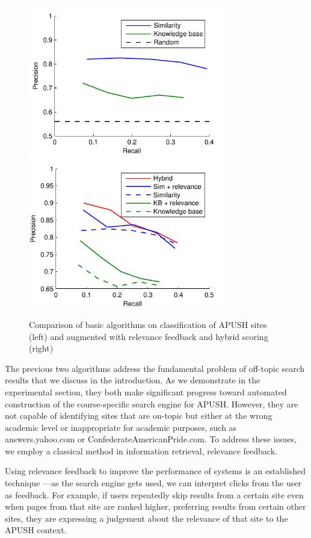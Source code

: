 \documentclass[pdfpagelabels=false,plainpages=true]{acm_proc_article-sp}
\begin{document}
\begin{figure}[t!]
\includegraphics[width=3.45in]{expt}
\includegraphics[width=3.45in]{expt_relevance}
\caption{Comparison of basic algorithms on classification of APUSH
  sites (left) and  augmented with relevance feedback and hybrid scoring (right)}
\label{fig-expt}
\end{figure}

The previous two algorithms address the fundamental problem of off-topic search
results that we discuss in the introduction. As we demonstrate in the
experimental section, they both make significant progress toward automated
construction of the course-specific search engine for APUSH. However, they are
not capable of identifying sites that are on-topic but either at the wrong
academic level or inappropriate for academic purposes, such as answers.yahoo.com or
ConfederateAmericanPride.com. To address these issues, we employ a classical
method in information retrieval, relevance feedback. 

Using relevance feedback to improve the performance of systems is an established
technique \cite{salton1997improving}---as the search engine gets used, we can
interpret clicks from the user as feedback. For example, if users repeatedly
skip results from a certain site even when pages from that site are ranked
higher, preferring results from certain other sites, they are expressing a
judgement about the relevance of that site to the APUSH context. 
\end{document}
